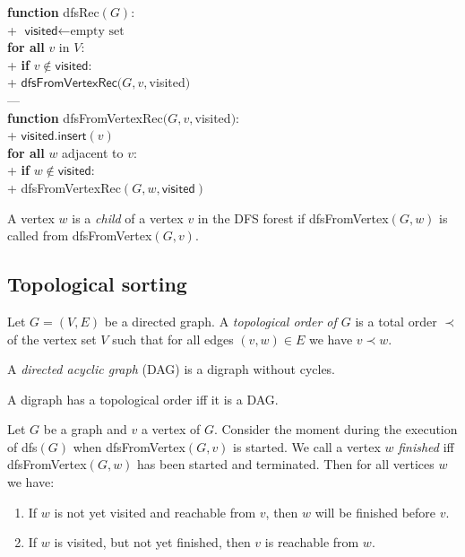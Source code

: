 \documentclass{article}
\begin{document}
\begin{pseudo}
	\textbf{function} \textsf{dfsRec}$(G)$:											\\+
	$\textsf{visited}\leftarrow\text{empty set}$								\\
	\textbf{for all} $v$ in $V$:												\\+
	\textbf{if} $v\not\in\textsf{visited}$:									\\+
	$\textsf{dfsFromVertexRec}(G, v, $\textsf{visited}$)$					\\---
	\\
	\textbf{function} \textsf{dfsFromVertexRec}$(G, v, $\textsf{visited}$)$:		\\+
	$\textsf{visited}.\textsf{insert}(v)$										\\
	\textbf{for all} $w$ adjacent to $v$:										\\+
	\textbf{if} $w\not\in\textsf{visited}$:									\\+
	\textsf{dfsFromVertexRec}$(G, w, \textsf{visited})$
\end{pseudo}

\begin{definition}
	A vertex $w$ is a \emph{child} of a vertex $v$ in the DFS
	forest if \textsf{dfsFromVertex}$(G,w)$ is called from
	\textsf{dfsFromVertex}$(G,v)$.
\end{definition}

\subsection{Topological sorting}

\begin{definition}
	Let $G=(V,E)$ be a directed graph. A \emph{topological order of $G$} is a
	total order $\prec$ of the vertex set $V$ such that for all edges $(v,w)\in E$
	we have $v\prec w$.
\end{definition}

\begin{definition}
	A \emph{directed acyclic graph} (DAG) is a digraph without cycles.
\end{definition}

\begin{theorem}
	A digraph has a topological order iff it is a DAG.
\end{theorem}

\begin{lemma}
	Let $G$ be a graph and $v$ a vertex of $G$. Consider the moment
	during the execution of \textsf{dfs}$(G)$ when \textsf{dfsFromVertex}$(G,v)$
	is started. We call a vertex $w$ \emph{finished} iff \textsf{dfsFromVertex}$(G,w)$
	has been started and terminated. Then for all vertices $w$ we have:
	\begin{enumerate}
		\item If $w$ is not yet visited and reachable from $v$, then $w$ will be
		      finished before $v$.
		\item If $w$ is visited, but not yet finished, then $v$ is reachable from $w$.
	\end{enumerate}
\end{lemma}
\end{document}
